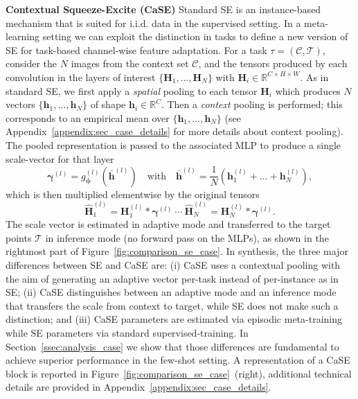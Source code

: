\documentclass{article}
\begin{document}
\textbf{Contextual Squeeze-Excite (CaSE)} Standard SE is an instance-based mechanism that is suited for i.i.d. data in the supervised setting. In a meta-learning setting we can exploit the distinction in tasks to define a new version of SE for task-based channel-wise feature adaptation. For a task $\tau=(\mathcal{C}, \mathcal{T})$, consider the $N$ images from the context set $\mathcal{C}$, and the tensors produced by each convolution in the layers of interest $\{ \mathbf{H}_1, \dots, \mathbf{H}_N \}$ with $ \mathbf{H}_i \in \mathbb{R}^{C \times H \times W}$.
As in standard SE, we first apply a \emph{spatial} pooling to each tensor $\mathbf{H}_i$ which produces $N$ vectors $\{ \mathbf{h}_1, \dots, \mathbf{h}_N \}$ of shape $\mathbf{h}_i \in \mathbb{R}^C$. Then a \emph{context} pooling is performed; this corresponds to an empirical mean over $\{ \mathbf{h}_1, \dots, \mathbf{h}_N \}$ (see Appendix~\ref{appendix:sec_case_details} for more details about context pooling). The pooled representation is passed to the associated MLP to produce a single scale-vector for that layer
\begin{equation} \label{eq:case_pooling}
\boldsymbol{\gamma}^{(l)} = g^{(l)}_{\boldsymbol{\phi}} \left( \mathbf{\bar{h}}^{(l)} \right)
\quad \text{with} \quad 
\mathbf{\bar{h}}^{(l)} = \frac{1}{N} \left( \mathbf{h}^{(l)}_1 + \dots + \mathbf{h}^{(l)}_N \right),
\end{equation}
which is then multiplied elementwise by the original tensors
\begin{equation}
    \hat{\mathbf{H}}^{(l)}_1 = \mathbf{H}_{1}^{(l)} \ast \boldsymbol{\gamma}^{(l)} \ \cdots \ \hat{\mathbf{H}}^{(l)}_N = \mathbf{H}_{N}^{(l)} \ast \boldsymbol{\gamma}^{(l)}.
\end{equation}
The scale vector is estimated in adaptive mode and transferred to the target points $\mathcal{T}$ in inference mode (no forward pass on the MLPs), as shown in the rightmost part of Figure~\ref{fig:comparison_se_case}. In synthesis, the three major differences between SE and CaSE are: (i) CaSE uses a contextual pooling with the aim of generating an adaptive vector per-task instead of per-instance as in SE; (ii) CaSE distinguishes between an adaptive mode and an inference mode that transfers the scale from context to target, while SE does not make such a distinction; and (iii) CaSE parameters are estimated via episodic meta-training while SE parameters via standard supervised-training.
In Section~\ref{ssec:analysis_case} we show that those differences are fundamental to achieve superior performance in the few-shot setting.
A representation of a CaSE block is reported in Figure~\ref{fig:comparison_se_case}~(right), additional technical details are provided in Appendix~\ref{appendix:sec_case_details}.
\end{document}
